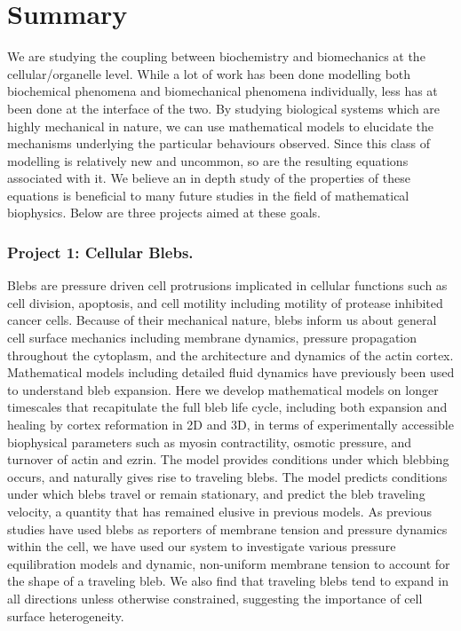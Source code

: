 \chapter{Summary}

We are studying the coupling between biochemistry and biomechanics at the cellular/organelle level. While a lot of work has been done modelling both biochemical phenomena and biomechanical phenomena individually, less has at been done at the interface of the two. By studying biological systems which are highly mechanical in nature, we can use mathematical models to elucidate the mechanisms underlying the particular behaviours observed. Since this class of modelling is relatively new and uncommon, so are the resulting equations associated with it. We believe an in depth study of the properties of these equations is beneficial to many future  studies in the field of mathematical biophysics. Below are three projects aimed at these goals. 

\subsection*{Project 1: Cellular Blebs.}
Blebs are pressure driven cell protrusions implicated in cellular functions such as cell division, apoptosis, and cell motility including motility of protease inhibited cancer cells. Because of their mechanical nature, blebs inform us about general cell surface mechanics including membrane dynamics, pressure propagation throughout the cytoplasm, and the architecture and dynamics of the actin cortex. Mathematical models including detailed fluid dynamics have previously been used to understand bleb expansion. Here we develop mathematical models on longer timescales that recapitulate the full bleb life cycle, including both expansion and healing by cortex reformation in 2D and 3D, in terms of experimentally accessible biophysical parameters such as myosin contractility, osmotic pressure, and turnover of actin and ezrin. The model provides conditions under which blebbing occurs, and naturally gives rise to traveling blebs. The model predicts conditions under which blebs travel or remain stationary, and predict the bleb traveling velocity, a quantity that has remained elusive in previous models.  As previous studies have used blebs as reporters of membrane tension and pressure dynamics within the cell, we have used our system to investigate various pressure equilibration models and dynamic, non-uniform membrane tension to account for the shape of a traveling bleb. We also find that traveling blebs tend to expand in all directions unless otherwise constrained, suggesting the importance of cell surface heterogeneity. 

